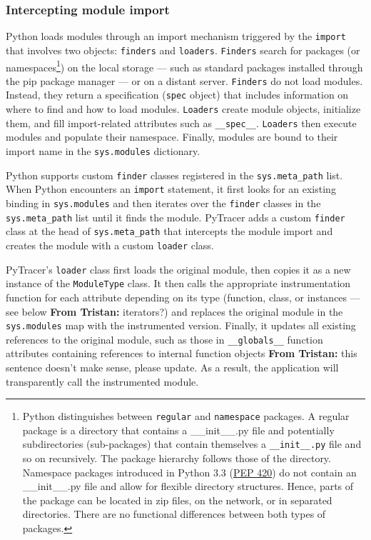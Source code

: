 \documentclass[11pt]{article}
\newcommand{\tristan}[1]{\color{orange}\textbf{From Tristan:} #1\color{black}\xspace}
\newcommand{\pytracer}[0]{PyTracer\xspace}
\begin{document}
\subsubsection{Intercepting module import}

Python loads modules through an import mechanism triggered by the \texttt{import} that involves two objects: \texttt{finders} and \texttt{loaders}. \texttt{Finders} search for packages (or 
namespaces\footnote{Python distinguishes between \texttt{regular} and \texttt{namespace} packages.
A regular package is a directory that contains a \_\_init\_\_.py file and potentially subdirectories (sub-packages) 
that contain themselves a \texttt{\_\_init\_\_.py} file and so on recursively. 
The package hierarchy follows those of the directory. 
Namespace packages introduced in Python 3.3 (\href{https://www.python.org/dev/peps/pep-0420/}{PEP 420}) do not contain an
\_\_init\_\_.py file and allow for flexible directory structures. Hence, parts of the package can be located in zip files, on the network, or in separated directories. There are no functional differences between both types of packages.}) on the local storage --- such as standard packages installed through the pip package manager --- or on a distant server.
\texttt{Finders} do not load modules. Instead, they return a specification (\texttt{spec} object) that includes 
information on where to find and how to load modules.
\texttt{Loaders} create module objects, initialize them, and fill import-related attributes 
such as \texttt{\_\_spec\_\_}. 
\texttt{Loaders} then execute modules and populate their namespace. Finally, modules are bound to their import name in the \texttt{sys.modules} dictionary.


Python supports custom \texttt{finder} classes registered in the \texttt{sys.meta\_path} list.
When Python encounters an \texttt{import} statement, it first looks for an existing binding in \texttt{sys.modules} and then iterates over the \texttt{finder} classes in the \texttt{sys.meta\_path} list until it finds the module. \pytracer adds a custom \texttt{finder} class at the head of \texttt{sys.meta\_path} that intercepts
the module import and creates the module with a custom \texttt{loader} class.

\pytracer's \texttt{loader} class first loads the original module, then copies it as a new instance of the \texttt{ModuleType} class. It then calls the appropriate instrumentation function for each attribute depending on its type (function, class, or instances --- see below \tristan{iterators?}) and replaces the original module in the \texttt{sys.modules} map with the instrumented version. Finally, it updates all existing references to the original module, such as those in \texttt{\_\_globals\_\_} function attributes containing references to internal function objects \tristan{this sentence doesn't make sense, please update}. As a result, the application will transparently call the instrumented module.
\end{document}
